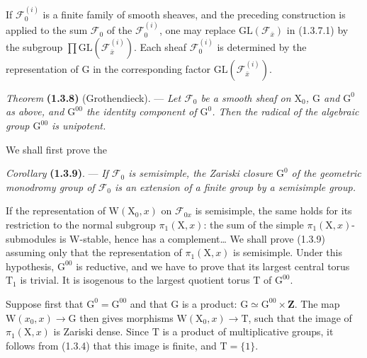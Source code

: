 \documentclass[11pt,leqno]{article}
\begin{document}
If \(\mathscr{F}_0^{(i)}\) is a finite family of smooth sheaves, and the preceding construction is applied to the sum \(\mathscr{F}_0\) of the \(\mathscr{F}_0^{(i)}\), one may replace \(\mathrm{GL}(\mathscr{F}_{\bar{x}})\) in (1.3.7.1) by the subgroup \(\prod\mathrm{GL}(\mathscr{F}_{\bar{x}}^{(i)})\). Each sheaf \(\mathscr{F}_0^{(i)}\) is determined by the representation of \(\mathrm{G}\) in the corresponding factor \(\mathrm{GL}(\mathscr{F}_{\bar{x}}^{(i)})\).

\textit{Theorem} \textbf{(1.3.8)} (Grothendieck). — \textit{Let \(\mathscr{F}_0\) be a smooth sheaf on \(\mathrm{X}_0\), \(\mathrm{G}\) and \(\mathrm{G}^0\) as above, and \(\mathrm{G}^{00}\) the identity component of \(\mathrm{G}^0\). Then the radical of the algebraic group \(\mathrm{G}^{00}\) is unipotent.}

We shall first prove the

\textit{Corollary} \textbf{(1.3.9)}. — \textit{If \(\mathscr{F}_0\) is semisimple, the Zariski closure \(\mathrm{G}^0\) of the geometric monodromy group of \(\mathscr{F}_0\) is an extension of a finite group by a semisimple group.}

If the representation of \(\mathrm{W}(\mathrm{X}_0,x)\) on \(\mathscr{F}_{0x}\) is semisimple, the same holds for its restriction to the normal subgroup \(\pi_1(\mathrm{X},x)\): the sum of the simple \(\pi_1(\mathrm{X},x)\)-submodules is \(\mathrm{W}\)-stable, hence has a complement\ldots{} We shall prove (1.3.9) assuming only that the representation of \(\pi_1(\mathrm{X},x)\) is semisimple. Under this hypothesis, \(\mathrm{G}^{00}\) is reductive, and we have to prove that its largest central torus \(\mathrm{T}_1\) is trivial. It is isogenous to the largest quotient torus \(\mathrm{T}\) of \(\mathrm{G}^{00}\).

Suppose first that \(\mathrm{G}^0=\mathrm{G}^{00}\) and that \(\mathrm{G}\) is a product: \(\mathrm{G}\simeq\mathrm{G}^{00}\times\mathbf{Z}\). The map \(\mathrm{W}(x_0,x)\to\mathrm{G}\) then gives morphisms \(\mathrm{W}(\mathrm{X}_0,x)\to\mathrm{T}\), such that the image of \(\pi_1(\mathrm{X},x)\) is Zariski dense. Since \(\mathrm{T}\) is a product of multiplicative groups, it follows from (1.3.4) that this image is finite, and \(\mathrm{T}=\{1\}\).
\end{document}
